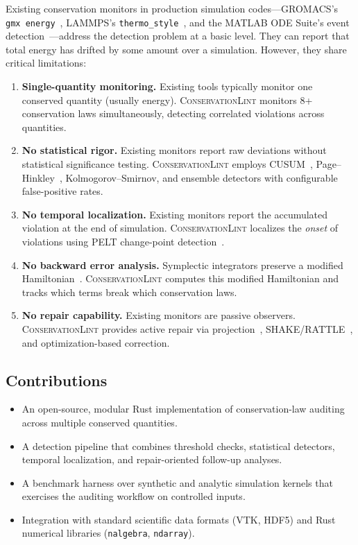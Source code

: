 \documentclass[11pt,a4paper]{article}
\begin{document}
Existing conservation monitors in production simulation codes---GROMACS's \texttt{gmx energy}~\citep{abraham2015}, LAMMPS's \texttt{thermo\_style}~\citep{thompson2022}, and the MATLAB ODE Suite's event detection~\citep{shampine1997}---address the detection problem at a basic level. They can report that total energy has drifted by some amount over a simulation. However, they share critical limitations:

\begin{enumerate}[leftmargin=*]
    \item \textbf{Single-quantity monitoring.} Existing tools typically monitor one conserved quantity (usually energy). \textsc{ConservationLint} monitors 8+ conservation laws simultaneously, detecting correlated violations across quantities.
    \item \textbf{No statistical rigor.} Existing monitors report raw deviations without statistical significance testing. \textsc{ConservationLint} employs CUSUM~\citep{page1954}, Page--Hinkley~\citep{hinkley1971}, Kolmogorov--Smirnov, and ensemble detectors with configurable false-positive rates.
    \item \textbf{No temporal localization.} Existing monitors report the accumulated violation at the end of simulation. \textsc{ConservationLint} localizes the \emph{onset} of violations using PELT change-point detection~\citep{killick2012}.
    \item \textbf{No backward error analysis.} Symplectic integrators preserve a modified Hamiltonian~\citep{hairer2006}. \textsc{ConservationLint} computes this modified Hamiltonian and tracks which terms break which conservation laws.
    \item \textbf{No repair capability.} Existing monitors are passive observers. \textsc{ConservationLint} provides active repair via projection~\citep{leimkuhler2004}, SHAKE/RATTLE~\citep{ryckaert1977,andersen1983}, and optimization-based correction.
\end{enumerate}

\subsection{Contributions}

\begin{itemize}[leftmargin=*]
    \item An open-source, modular Rust implementation of
    conservation-law auditing across multiple conserved quantities.
    \item A detection pipeline that combines threshold checks,
    statistical detectors, temporal localization, and repair-oriented
    follow-up analyses.
    \item A benchmark harness over synthetic and analytic simulation
    kernels that exercises the auditing workflow on controlled inputs.
    \item Integration with standard scientific data formats (VTK,
    HDF5) and Rust numerical libraries (\texttt{nalgebra},
    \texttt{ndarray}).
\end{itemize}
\end{document}
